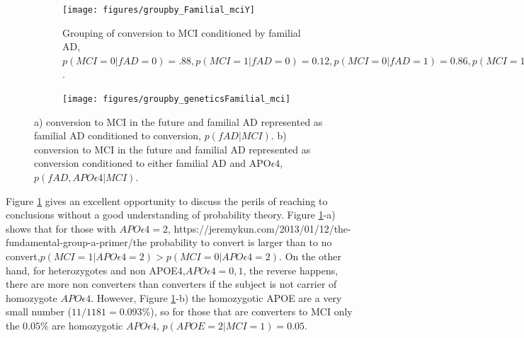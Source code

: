 \documentclass[11pt]{article}
\theoremstyle{definition}
\theoremstyle{remark}
\begin{document}
\begin{figure}[H]
    \centering
    
    \begin{subfigure}[t]{0.45\textwidth}
        \centering
        \texttt{[image: figures/groupby\_Familial\_mciY]}
        \caption{Grouping of conversion to MCI conditioned by familial AD,$p(MCI=0|fAD=0)=.88, p(MCI=1|fAD=0)=0.12, p(MCI=0|fAD=1)=0.86, p(MCI=1|fAD=1)=0.14$. }
    \end{subfigure}
    \begin{subfigure}[t]{0.45\textwidth}
        \centering
        \texttt{[image: figures/groupby\_geneticsFamilial\_mci]}
        \caption{ }
    \end{subfigure}
   
    \caption{a) conversion to MCI in the future and familial AD  represented as familial AD conditioned to conversion, $p(fAD|MCI)$. b) conversion to MCI in the future and familial AD represented as conversion conditioned to either familial AD and APO$\epsilon4$, $p(fAD, APO\epsilon4|MCI)$.}
    \label{fig:genfami}
\end{figure}

Figure \ref{fig:genfami} gives an excellent opportunity to discuss the perils of reaching to conclusions without a good understanding of probability theory. 
Figure \ref{fig:genfami}-a) shows that for those with $APO\epsilon4=2$, https://jeremykun.com/2013/01/12/the-fundamental-group-a-primer/the probability to convert is larger than to no convert,$p(MCI=1|APO\epsilon4=2) > p(MCI=0|APO\epsilon4=2)$. On the other hand, for heterozygotes and non APOE4,$APO\epsilon4=0,1$, the reverse happens, there are more non converters than converters if the subject is not carrier of homozygote $APO\epsilon4$. 
However, Figure \ref{fig:genfami}-b) the homozygotic APOE are a very small number ($11/1181 = 0.093\%$), so for those that are converters to MCI only the $0.05\%$ are homozygotic $APO\epsilon4$, $p(APOE=2|MCI=1)=0.05$.
\end{document}
